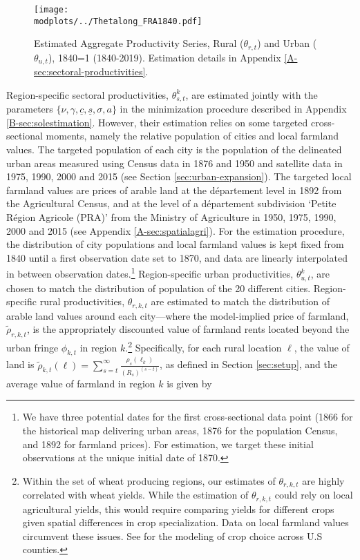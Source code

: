 \documentclass[./20250130-paper.tex]{subfiles}
\begin{document}
\begin{figure}[h!]
	\begin{center}
		\texttt{[image: \\modplots/../Thetalong\_FRA1840.pdf]}
	\end{center}
	\vspace{-0.5cm}
	\caption{Estimated Aggregate Productivity Series, Rural ($\theta_{r,t}$) and Urban ($\theta_{u,t}$), 1840=1 (1840-2019). Estimation details in Appendix \ref{A-sec:sectoral-productivities}.}
	\label{fig:theta}
\end{figure}

Region-specific sectoral productivities, $\theta^k_{s,t}$, are estimated jointly with the parameters $\{\nu, \gamma, \underline{c}, \underline{s}, \sigma, a\}$ in the minimization procedure described in Appendix \ref{B-sec:solestimation}. However, their estimation relies on some targeted cross-sectional moments, namely the relative population of cities and local farmland values. The targeted population of each city is the population of the delineated urban areas measured using Census data in 1876 and 1950 and satellite data in 1975, 1990, 2000 and 2015 (see Section \ref{sec:urban-expansion}). The targeted local farmland values are prices of arable land at the département level in 1892 from the Agricultural Census, and at the level of a département subdivision `Petite Région Agricole (PRA)' from the Ministry of Agriculture in 1950, 1975, 1990, 2000 and 2015 (see Appendix \ref{A-sec:spatialagri}). For the estimation procedure, the distribution of city populations and local farmland values is kept fixed from 1840 until a first observation date set to 1870, and data are linearly interpolated in between observation dates.\footnote{We have three potential dates for the first cross-sectional data point (1866 for the historical map delivering urban areas, 1876 for the population Census, and 1892 for farmland prices). For estimation, we target these initial observations at the unique initial date of 1870.} Region-specific urban productivities, $\theta^k_{u,t}$, are chosen to match the distribution of population of the 20 different cities. Region-specific rural productivities, $\theta_{r,k,t}$ are estimated to match the distribution of arable land values around each city---where the model-implied price of farmland, $\tilde{\rho}_{r,k,t}$, is the appropriately discounted value of farmland rents located beyond the urban fringe $\phi_{k,t}$ in region $k$.\footnote{Within the set of wheat producing regions, our estimates of $\theta_{r,k,t}$ are highly correlated with wheat yields. While the estimation of $\theta_{r,k,t}$ could rely on local agricultural yields, this would require comparing yields for different crops given spatial differences in crop specialization. Data on local farmland values circumvent these issues. See \cite{fiszbein2022agricultural} for the modeling of crop choice across U.S counties.} Specifically, for each rural location $\ell$, the value of land is $\tilde{\rho}_{k,t}(\ell) = \sum_{s=t}^\infty \frac{\rho_s(\ell_k)}{(R_s)^{(s-t)}}$, as defined in Section \ref{sec:setup}, and the average value of farmland in region $k$ is given by
\end{document}
